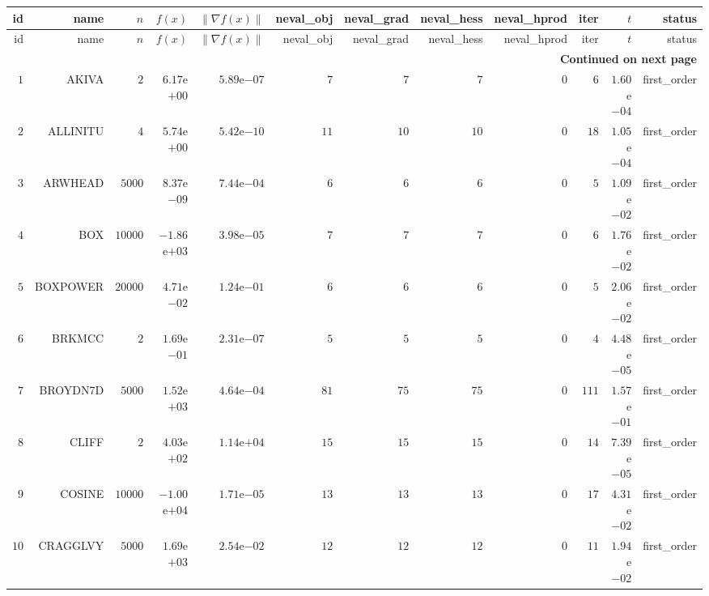 \begin{longtable}{rrrrrrrrrrrr}
  \hline
  id & name & \(n\) & \(f(x)\) & \(\|\nabla f(x)\|\) & neval\_obj & neval\_grad & neval\_hess & neval\_hprod & iter & \(t\) & status \\\hline
  \endfirsthead
  \hline
  id & name & \(n\) & \(f(x)\) & \(\|\nabla f(x)\|\) & neval\_obj & neval\_grad & neval\_hess & neval\_hprod & iter & \(t\) & status \\\hline
  \endhead
  \hline
  \multicolumn{12}{r}{{\bfseries Continued on next page}}\\
  \hline
  \endfoot
  \endlastfoot
  \(     1\) & AKIVA & \(     2\) & \( 6.17\)e\(+00\) & \( 5.89\)e\(-07\) & \(     7\) & \(     7\) & \(     7\) & \(     0\) & \(     6\) & \( 1.60\)e\(-04\) & first\_order \\
  \(     2\) & ALLINITU & \(     4\) & \( 5.74\)e\(+00\) & \( 5.42\)e\(-10\) & \(    11\) & \(    10\) & \(    10\) & \(     0\) & \(    18\) & \( 1.05\)e\(-04\) & first\_order \\
  \(     3\) & ARWHEAD & \(  5000\) & \( 8.37\)e\(-09\) & \( 7.44\)e\(-04\) & \(     6\) & \(     6\) & \(     6\) & \(     0\) & \(     5\) & \( 1.09\)e\(-02\) & first\_order \\
  \(     4\) & BOX & \( 10000\) & \(-1.86\)e\(+03\) & \( 3.98\)e\(-05\) & \(     7\) & \(     7\) & \(     7\) & \(     0\) & \(     6\) & \( 1.76\)e\(-02\) & first\_order \\
  \(     5\) & BOXPOWER & \( 20000\) & \( 4.71\)e\(-02\) & \( 1.24\)e\(-01\) & \(     6\) & \(     6\) & \(     6\) & \(     0\) & \(     5\) & \( 2.06\)e\(-02\) & first\_order \\
  \(     6\) & BRKMCC & \(     2\) & \( 1.69\)e\(-01\) & \( 2.31\)e\(-07\) & \(     5\) & \(     5\) & \(     5\) & \(     0\) & \(     4\) & \( 4.48\)e\(-05\) & first\_order \\
  \(     7\) & BROYDN7D & \(  5000\) & \( 1.52\)e\(+03\) & \( 4.64\)e\(-04\) & \(    81\) & \(    75\) & \(    75\) & \(     0\) & \(   111\) & \( 1.57\)e\(-01\) & first\_order \\
  \(     8\) & CLIFF & \(     2\) & \( 4.03\)e\(+02\) & \( 1.14\)e\(+04\) & \(    15\) & \(    15\) & \(    15\) & \(     0\) & \(    14\) & \( 7.39\)e\(-05\) & first\_order \\
  \(     9\) & COSINE & \( 10000\) & \(-1.00\)e\(+04\) & \( 1.71\)e\(-05\) & \(    13\) & \(    13\) & \(    13\) & \(     0\) & \(    17\) & \( 4.31\)e\(-02\) & first\_order \\
  \(    10\) & CRAGGLVY & \(  5000\) & \( 1.69\)e\(+03\) & \( 2.54\)e\(-02\) & \(    12\) & \(    12\) & \(    12\) & \(     0\) & \(    11\) & \( 1.94\)e\(-02\) & first\_order \\

\end{longtable}
